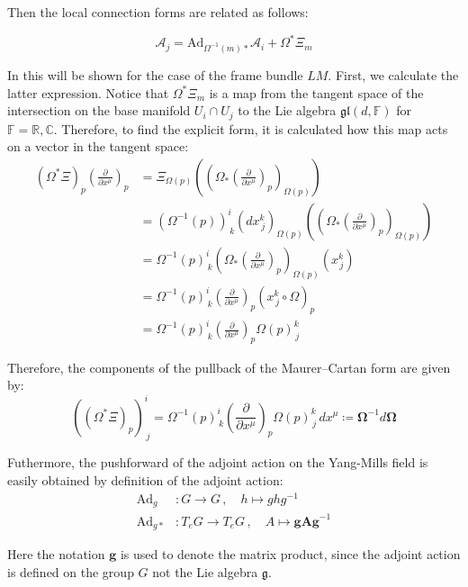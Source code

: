 Then the local connection forms are related as follows:

\[ \mathcal{A}_j = \text{Ad}_{\Omega^{-1}(m)*} \mathcal{A}_i + \Omega^*\Xi_m \]

In this will be shown for the case of the frame bundle \( LM \). First, we calculate the latter expression. Notice that \( \Omega^* \Xi_m \) is a map from the tangent space of the intersection on the base manifold \( U_i \cap U_j \) to the Lie algebra \( \mathfrak{gl}(d, \mathbb{F}) \) for $\mathbb{F} = \mathbb{R,C}$. Therefore, to find the explicit form, it is calculated how this map acts on a vector in the tangent space:
\begin{align*}
  (\Omega^* \Xi)_p \left( \frac{\partial}{\partial x^\mu} \right)_p 
  &= \Xi_{\Omega(p)}\left( \left( \Omega_* \left( \frac{\partial}{\partial x^\mu} \right)_p \right)_{\Omega(p)} \right) \\
  &= (\Omega^{-1}(p))^i_{\,k}(dx^k_{\,j})_{\Omega(p)}\left( \left( \Omega_* \left( \frac{\partial}{\partial x^\mu} \right)_p \right)_{\Omega(p)} \right) \\
  &= \Omega^{-1}(p)^i_{\,k} \left( \Omega_* \left( \frac{\partial}{\partial x^\mu} \right)_p \right)_{\Omega(p)} \left( x^k_{\,j} \right) \\
  &= \Omega^{-1}(p)^i_{\,k} \left( \frac{\partial}{\partial x^\mu}  \right)_p \left( x^k_{\,j} \circ \Omega \right)_p \\
  &= \Omega^{-1}(p)^i_{\,k} \left( \frac{\partial}{\partial x^\mu}  \right)_p \Omega(p)^k_{\,j}
\end{align*}

Therefore, the components of the pullback of the Maurer–Cartan form are given by\cite{FredericSchullerLocalrepresentationsconnectionbasemanifoldYangMillsfieldsLec222015}:
\[
\left( (\Omega^* \Xi)_p \right)^i_{\,j} 
= \Omega^{-1}(p)^i_{\,k} \left( \frac{\partial}{\partial x^\mu} \right)_p \Omega(p)^k_{\,j} \, dx^\mu 
\coloneqq \mathbf{\Omega}^{-1} d\mathbf{\Omega}
\]



Futhermore, the pushforward of the adjoint action on the Yang-Mills field is easily obtained by definition of the adjoint action:
\begin{align*}
  \text{Ad}_g &: G \longrightarrow G \, , \quad h \mapsto ghg^{-1} \\
  \text{Ad}_{g*} &: T_eG \longrightarrow T_eG \, , \quad A \mapsto \mathbf{g A g}^{-1}
\end{align*}

Here the notation $\mathbf{g}$ is used to denote the matrix product, since the adjoint action is defined on the group $G$ not the Lie algebra $\mathfrak{g}$.

